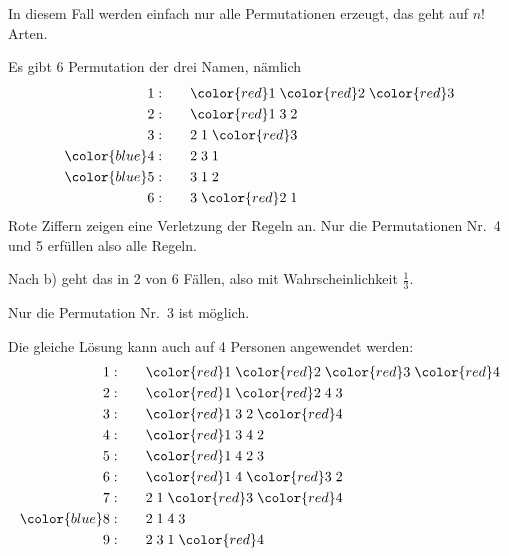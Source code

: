 \begin{loesung}
\begin{teilaufgaben}
\item 
In diesem Fall werden einfach nur alle Permutationen erzeugt,
das geht auf $n!$ Arten.
\item
Es gibt 6 Permutation der drei Namen,  nämlich
\begin{align*}
             1: \qquad&{\color{red}1}\;{\color{red}2}\;{\color{red}3}\\
             2: \qquad&{\color{red}1}\;            3 \;            2 \\
             3: \qquad&            2 \;            1 \;{\color{red}3}\\
{\color{blue}4:}\qquad&            2 \;            3 \;            1 \\
{\color{blue}5:}\qquad&            3 \;            1 \;            2 \\
             6: \qquad&            3 \;{\color{red}2}\;            1 
\end{align*}
Rote Ziffern zeigen eine Verletzung der Regeln an.
Nur die Permutationen Nr.~{\color{blue}4} und {\color{blue}5}
erfüllen also alle Regeln.
\item
Nach b) geht das in 2 von 6 Fällen, also mit Wahrscheinlichkeit $\frac13$.
\item
Nur die Permutation Nr.~3 ist möglich.
\item
Die gleiche Lösung kann auch auf 4 Personen angewendet werden:
\begin{align*}
 1: \qquad&{\color{red}1}\;{\color{red}2}\;{\color{red}3}\;{\color{red}4}\\
 2: \qquad&{\color{red}1}\;{\color{red}2}\;            4 \;            3 \\
 3: \qquad&{\color{red}1}\;            3 \;            2 \;{\color{red}4}\\
 4: \qquad&{\color{red}1}\;            3 \;            4 \;            2 \\
 5: \qquad&{\color{red}1}\;            4 \;            2 \;            3 \\
 6: \qquad&{\color{red}1}\;            4 \;{\color{red}3}\;            2 \\
%
 7: \qquad&            2 \;            1 \;{\color{red}3}\;{\color{red}4}\\
{\color{blue}
 8:}\qquad&            2 \;            1 \;            4 \;            3 \\
 9: \qquad&            2 \;            3 \;            1 \;{\color{red}4}\\

\end{align*}
\end{teilaufgaben}
\end{loesung}
